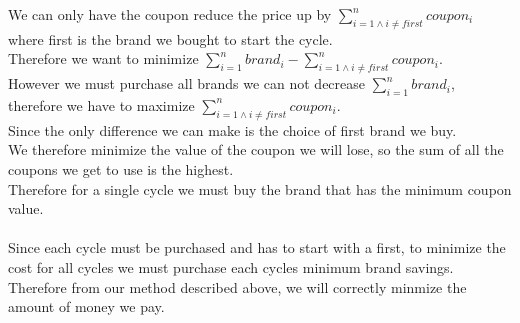 \documentclass{article}
\begin{document}
      We can only have the coupon reduce the price up by $\sum_{i = 1 \land i \neq first}^{n} coupon_{i}$ where first is the brand we bought to start the cycle.\\
      Therefore we want to minimize $\sum_{i = 1}^{n} brand_{i} - \sum_{i = 1 \land i \neq first}^{n} coupon_{i}$.\\
      However we must purchase all brands we can not decrease $\sum_{i = 1}^{n} brand_{i}$, therefore we have to maximize $\sum_{i = 1 \land i \neq first}^{n} coupon_{i}$.\\
      Since the only difference we can make is the choice of first brand we buy.\\
      We therefore minimize the value of the coupon we will lose, so the sum of all the coupons we get to use is the highest.\\
      Therefore for a single cycle we must buy the brand that has the minimum coupon value.\\
      \\
      Since each cycle must be purchased and has to start with a first, to minimize the cost for all cycles we must purchase each cycles minimum brand savings.\\
      Therefore from our method described above, we will correctly minmize the amount of money we pay.\\
\end{document}
